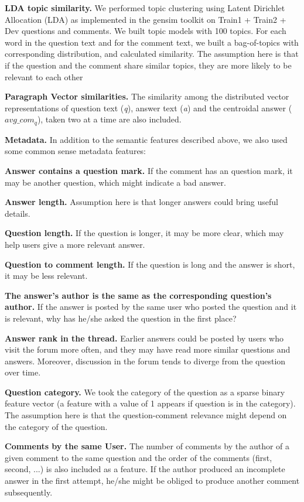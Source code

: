 \documentclass[12pt, a4paper, oneside]{Thesis} %
\begin{document}
\textbf{LDA topic similarity.} We performed topic clustering using Latent Dirichlet Allocation (LDA) as implemented in the gensim toolkit \cite{rehurek2010software} on Train1 + Train2 + Dev questions and comments. We built topic models with 100 topics. For each word in the question text and for the comment text, we built a bag-of-topics with corresponding distribution, and calculated similarity. The assumption here is that if the question and the comment share similar topics, they are more likely to be relevant to each other

\textbf{Paragraph Vector similarities.} The similarity among the distributed vector representations of question text (\textit{q}), answer text (\textit{a}) and the centroidal answer ($avg\_com_q$), taken two at a time are also included.

\textbf{Metadata.} In addition to the semantic features described above, we also used some common sense metadata features:

\textbf{Answer contains a question mark.} If the comment has an question mark, it may be another question, which might indicate a bad answer.

\textbf{Answer length.} Assumption here is that longer answers could bring useful details.

\textbf{Question length.} If the question is longer, it may be more clear, which may help users give a more relevant answer.

\textbf{Question to comment length.} If the question is long and the answer is short, it may be less relevant.

\textbf{The answer’s author is the same as the corresponding question’s author.} If the answer is posted by the same user who posted the question and it is relevant, why has he/she asked the question in the first place?

\textbf{Answer rank in the thread.} Earlier answers could be posted by users who visit the forum more often, and they may have read more similar questions and answers. Moreover, discussion in the forum tends to diverge from the question over time.

\textbf{Question category.} We took the category of the question as a sparse binary feature vector (a feature with a value of 1 appears if question is in the category). The assumption here is that the question-comment relevance might depend on the category of the question.

\textbf{Comments by the same User.} The number of comments by the author of a given comment to the same question and the order of the comments (first, second, ...) is also included as a feature. If the author produced an incomplete answer in the first attempt, he/she might be obliged to produce another comment subsequently.
\end{document}
